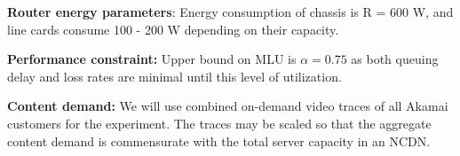 \textbf{Router energy parameters}: Energy consumption of chassis is R = 600 W, and line cards consume 100 - 200 W depending on their capacity.

\textbf{Performance constraint:} Upper bound on MLU is $\alpha = 0.75$ as both queuing delay and loss rates are minimal until this level of utilization. 

\textbf{Content demand:} We will use combined on-demand video traces of all Akamai customers for the experiment. The traces may be scaled so that the aggregate content demand is commensurate with the total server capacity in an NCDN.





















%
%
%
%
%



